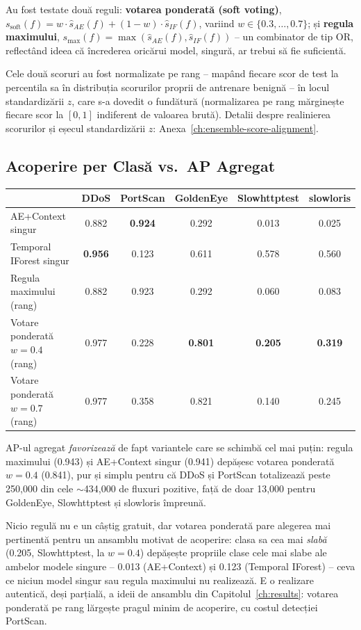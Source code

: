 Au fost testate două reguli: \textbf{votarea ponderată (soft voting)}, $s_{\text{soft}}(f) = w \cdot \hat{s}_{AE}(f) + (1-w) \cdot \hat{s}_{IF}(f)$, variind $w \in \{0.3, \dots, 0.7\}$; și \textbf{regula maximului}, $s_{\text{max}}(f) = \max(\hat{s}_{AE}(f), \hat{s}_{IF}(f))$ -- un combinator de tip OR, reflectând ideea că încrederea oricărui model, singură, ar trebui să fie suficientă.

Cele două scoruri au fost normalizate pe rang -- mapând fiecare scor de test la percentila sa în distribuția scorurilor proprii de antrenare benignă -- în locul standardizării $z$, care s-a dovedit o fundătură (normalizarea pe rang mărginește fiecare scor la $[0,1]$ indiferent de valoarea brută). Detalii despre realinierea scorurilor și eșecul standardizării $z$: Anexa~\ref{ch:ensemble-score-alignment}.

\subsection{Acoperire per Clasă vs.\ AP Agregat}
\label{sec:explain-ensemble-results}

\begin{center}
\begin{tabular}{@{}lccccc@{}}
\toprule
 & DDoS & PortScan & GoldenEye & Slowhttptest & slowloris \\
\midrule
AE+Context singur         & 0.882 & \textbf{0.924} & 0.292 & 0.013 & 0.025 \\
Temporal IForest singur   & \textbf{0.956} & 0.123 & 0.611 & 0.578 & 0.560 \\
Regula maximului (rang)   & 0.882 & 0.923 & 0.292 & 0.060 & 0.083 \\
Votare ponderată $w=0.4$ (rang) & 0.977 & 0.228 & \textbf{0.801} & \textbf{0.205} & \textbf{0.319} \\
Votare ponderată $w=0.7$ (rang) & 0.977 & 0.358 & 0.821 & 0.140 & 0.245 \\
\bottomrule
\end{tabular}
\end{center}

AP-ul agregat \emph{favorizează} de fapt variantele care se schimbă cel mai puțin: regula maximului (0.943) și AE+Context singur (0.941) depășesc votarea ponderată $w=0.4$ (0.841), pur și simplu pentru că DDoS și PortScan totalizează peste 250{,}000 din cele $\sim$434{,}000 de fluxuri pozitive, față de doar 13{,}000 pentru GoldenEye, Slowhttptest și slowloris împreună.

Nicio regulă nu e un câștig gratuit, dar votarea ponderată pare alegerea mai pertinentă pentru un ansamblu motivat de acoperire: clasa sa cea mai \emph{slabă} (0.205, Slowhttptest, la $w=0.4$) depășește propriile clase cele mai slabe ale ambelor modele singure -- 0.013 (AE+Context) și 0.123 (Temporal IForest) -- ceva ce niciun model singur sau regula maximului nu realizează. E o realizare autentică, deși parțială, a ideii de ansamblu din Capitolul~\ref{ch:results}: votarea ponderată pe rang lărgește pragul minim de acoperire, cu costul detecției PortScan.
